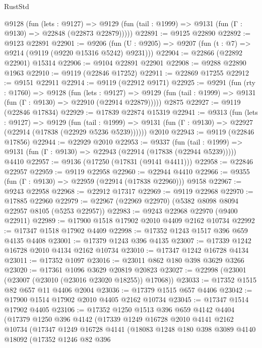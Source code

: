 \begin{lexlean}{RustStd}
\begin{coremodule}
    @9128
      (fun (lets : @9127) =>
      @9129 (fun (tail : @1999) => @9131 (fun (Γ : @9130) => @22848 (@22873 @22879)))))
@22891 := @9125 @22890
@22892 := @9123 @22891
@22901 := @9206
    (fun (U : @9205) => @9207 (fun (t : @7) => @9214 (@9119 (@9220 @15316 @5242) @9231)))
@22904 := @22866 (@22892 @22901) @15314
@22906 := @9104 @22891 @22901
@22908 := @9288 @22890 @1963
@22910 := @9119 (@22846 @17252)
@22911 := @22869 @17255
@22912 := @9151 @22911
@22914 := @9119 (@22912 @9171)
@22925 := @9291
    (fun (rty : @1760) =>
    @9128
      (fun (lets : @9127) =>
      @9129 (fun (tail : @1999) => @9131 (fun (Γ : @9130) => @22910 (@22914 @22879)))))
    @2875
@22927 := @9119 (@22846 @17834)
@22929 := @17839 @22874 @15319
@22941 := @9313
    (fun (lets : @9127) =>
    @9129
      (fun (tail : @1999) =>
      @9131 (fun (Γ : @9130) => @22927 (@22914 (@17838 (@22929 @5236 @5239))))))
    @2010
@22943 := @9119 (@22846 @17856)
@22944 := @22929 @2010
@22953 := @9337
    (fun (tail : @1999) => @9131 (fun (Γ : @9130) => @22943 (@22914 (@17838 (@22944 @5239)))))
    @4410
@22957 := @9136 (@17250 (@17831 (@9141 @4411)))
@22958 := @22846 @22957
@22959 := @9119 @22958
@22960 := @22944 @4410
@22966 := @9355 (fun (Γ : @9130) => @22959 (@22914 (@17838 @22960))) @9158
@22967 := @9243 @22958
@22968 := @22912 @17317
@22969 := @9119 @22968
@22970 := @17885 @22960
@22979 := @22967 (@22969 @22970) (@5382 @8098 @8094 @22957 @8105 (@5253 @22957))
@22983 := @9243 @22968 @22970 (@9400 @22911)
@22989 := @17900 @1518 @17902 @2010 @4409 @2162 @10734
@22992 := @17347 @1518 @17902 @4409
@22998 := @17352 @1243 @1517 @396 @659 @4135 @4408
@23001 := @17379 @1243 @396 @4135
@23007 := @17339 @1242 @16728 @2010 @4134 @2162 @10734
@23010 := @17347 @1242 @16728 @4134
@23011 := @17352 @1097
@23016 := @23011 @862 @180 @398 @3629 @3266
@23020 := @17361 @1096 @3629 @20819 @20823
@23027 := @22998 (@23001 (@23007 (@23010 (@23016 @23020 @18255)) @17068))
@23033 := @17352 @1515 @82 @657 @11 @4406 @2004
@23036 := @17379 @1515 @657 @4406
@23042 := @17900 @1514 @17902 @2010 @4405 @2162 @10734
@23045 := @17347 @1514 @17902 @4405
@23106 := @17352
    @1250
    @1513
    @396
    @659
    @4142
    @4404
    (@17379
      @1250
      @396
      @4142
      (@17339
        @1249
        @16728
        @2010
        @4141
        @2162
        @10734
        (@17347
          @1249
          @16728
          @4141
          (@18083
            @1248
            @180
            @398
            @3089
            @4140
            @18092
            (@17352
              @1246
              @82
              @396

\end{coremodule}
\end{lexlean}
